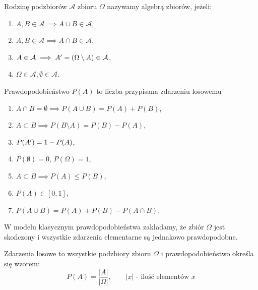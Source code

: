 \documentclass[../Matematyka.tex]{subfiles}
\begin{document}
    Rodzinę podzbiorów \(\mathcal{A}\) zbioru \(\Omega\) nazywamy algebrą zbiorów, jeżeli:
    \begin{enumerate}[label=(\roman*)]
        \item \(A, B \in \mathcal{A} \implies A \cup B \in \mathcal{A}\),
        \item \(A, B \in \mathcal{A} \implies A \cap B \in \mathcal{A}\),
        \item \(A \in \mathcal{A} \implies A^\prime = (\Omega \setminus A) \in \mathcal{A}\),
        \item \(\Omega \in \mathcal{A}, \emptyset \in \mathcal{A}\).
    \end{enumerate}

    \newpage
    Prawdopodobieństwo \(P(A)\) to liczba przypisana zdarzeniu losowemu
    \begin{enumerate}[label=(\roman*)]
        \item \(A \cap B = \emptyset \implies P(A \cup B) = P(A) + P(B)\),
        \item \(A \subset B \implies P(B \setminus A) = P(B) - P(A)\),
        \item \(P(A^\prime) = 1 - P(A)\),
        \item \(P(\emptyset) = 0\), \(P(\Omega) = 1\),
        \item \(A \subset B \implies P(A) \leq P(B)\),
        \item \(P(A) \in [0,1]\),
        \item \(P(A \cup B) = P(A) + P(B) - P(A \cap B)\).
    \end{enumerate}

    W modelu klasycznym prawdopodobieństwa zakładamy, że zbiór \(\Omega\) jest skończony i wszystkie zdarzenia elementarne są jednakowo prawdopodobne.
    
    Zdarzenia losowe to wszystkie podzbiory zbioru \(\Omega\) i prawdopodobieństwo określa się wzorem:
    \[P(A) = \frac{|A|}{|\Omega|}, \qquad |x| \text{ - ilość elementów }x\] 
\end{document}

